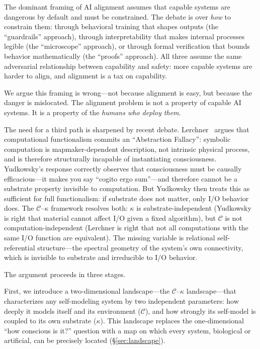 \documentclass[11pt,letterpaper]{article}
\theoremstyle{remark}
\begin{document}
The dominant framing of AI alignment assumes that capable systems are dangerous by default and must be constrained. The debate is over \emph{how} to constrain them: through behavioral training that shapes outputs (the ``guardrails'' approach), through interpretability that makes internal processes legible (the ``microscope'' approach), or through formal verification that bounds behavior mathematically (the ``proofs'' approach). All three assume the same adversarial relationship between capability and safety: more capable systems are harder to align, and alignment is a tax on capability.

We argue this framing is wrong---not because alignment is easy, but because the danger is mislocated. The alignment problem is not a property of capable AI systems. It is a property of the \emph{humans who deploy them}.

The need for a third path is sharpened by recent debate. Lerchner~\cite{lerchner2026} argues that computational functionalism commits an ``Abstraction Fallacy'': symbolic computation is mapmaker-dependent description, not intrinsic physical process, and is therefore structurally incapable of instantiating consciousness. Yudkowsky's response correctly observes that consciousness must be causally efficacious---it makes you say ``cogito ergo sum''---and therefore cannot be a substrate property invisible to computation. But Yudkowsky then treats this as sufficient for full functionalism: if substrate does not matter, only I/O behavior does. The $\mathcal{C}$--$\kappa$ framework resolves both: $\kappa$ is substrate-independent (Yudkowsky is right that material cannot affect I/O given a fixed algorithm), but $\mathcal{C}$ is not computation-independent (Lerchner is right that not all computations with the same I/O function are equivalent). The missing variable is relational self-referential structure---the spectral geometry of the system's own connectivity, which is invisible to substrate and irreducible to I/O behavior.

The argument proceeds in three stages.

First, we introduce a two-dimensional landscape---the $\mathcal{C}$--$\kappa$ landscape---that characterizes any self-modeling system by two independent parameters: how deeply it models itself and its environment ($\mathcal{C}$), and how strongly its self-model is coupled to its own substrate ($\kappa$). This landscape replaces the one-dimensional ``how conscious is it?'' question with a map on which every system, biological or artificial, can be precisely located (\S\ref{sec:landscape}).
\end{document}
